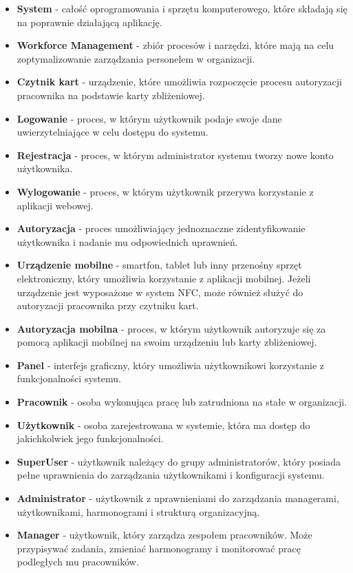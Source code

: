 \begin{itemize}
    \item \textbf{System} - całość oprogramowania i sprzętu komputerowego, które składają się na poprawnie działającą aplikację.
    \item \textbf{Workforce Management} - zbiór procesów i narzędzi, które mają na celu zoptymalizowanie zarządzania personelem w organizacji.
    \item \textbf{Czytnik kart} - urządzenie, które umożliwia rozpoczęcie procesu autoryzacji pracownika na podstawie karty zbliżeniowej.
    \item \textbf{Logowanie} - proces, w którym użytkownik podaje swoje dane uwierzytelniające w celu dostępu do systemu.
    \item \textbf{Rejestracja} - proces, w którym administrator systemu tworzy nowe konto użytkownika.
    \item \textbf{Wylogowanie} - proces, w którym użytkownik przerywa korzystanie z aplikacji webowej.
    \item \textbf{Autoryzacja} - proces umożliwiający jednoznaczne zidentyfikowanie użytkownika i nadanie mu odpowiednich uprawnień.
    \item \textbf{Urządzenie mobilne} - smartfon, tablet lub inny przenośny sprzęt elektroniczny, który umożliwia korzystanie z aplikacji mobilnej. Jeżeli urządzenie jest wyposażone w system NFC, może również służyć do autoryzacji pracownika przy czytniku kart.
    \item \textbf{Autoryzacja mobilna} - proces, w którym użytkownik autoryzuje się za pomocą aplikacji mobilnej na swoim urządzeniu lub karty zbliżeniowej.
    \item \textbf{Panel} - interfejs graficzny, który umożliwia użytkownikowi korzystanie z funkcjonalności systemu.
    \item \textbf{Pracownik} - osoba wykonująca pracę lub zatrudniona na stałe w organizacji.
    \item \textbf{Użytkownik} - osoba zarejestrowana w systemie, która ma dostęp do jakichkolwiek jego funkcjonalności.
    \item \textbf{SuperUser} - użytkownik należący do grupy administratorów, który posiada pełne uprawnienia do zarządzania użytkownikami i konfiguracji systemu.
    \item \textbf{Administrator} - użytkownik z uprawnieniami do zarządzania managerami, użytkownikami, harmonogrami i strukturą organizacyjną.
    \item \textbf{Manager} - użytkownik, który zarządza zespołem pracowników. Może przypisywać zadania, zmieniać harmonogramy i monitorować pracę podległych mu pracowników.

\end{itemize}
